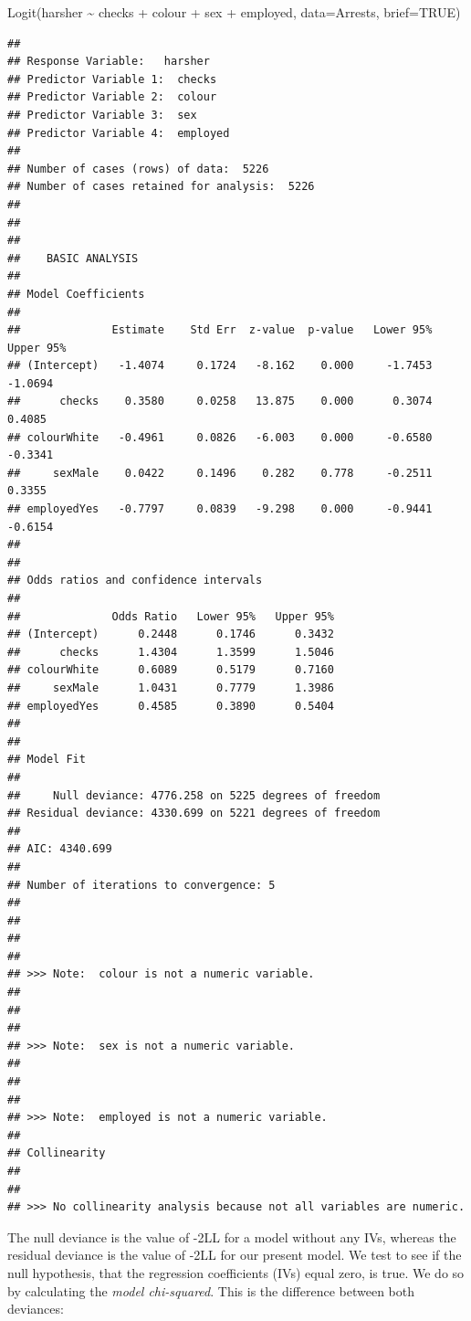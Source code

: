\documentclass[
]{book}
\newenvironment{Shaded}{\begin{snugshade}}{\end{snugshade}}
\newcommand{\AttributeTok}[1]{\textcolor[rgb]{0.77,0.63,0.00}{#1}}
\newcommand{\ConstantTok}[1]{\textcolor[rgb]{0.00,0.00,0.00}{#1}}
\newcommand{\FunctionTok}[1]{\textcolor[rgb]{0.00,0.00,0.00}{#1}}
\newcommand{\NormalTok}[1]{#1}
\newcommand{\SpecialCharTok}[1]{\textcolor[rgb]{0.00,0.00,0.00}{#1}}
\begin{document}
\begin{Shaded}
\begin{Highlighting}[]
\FunctionTok{Logit}\NormalTok{(harsher }\SpecialCharTok{\textasciitilde{}}\NormalTok{ checks }\SpecialCharTok{+}\NormalTok{ colour }\SpecialCharTok{+}\NormalTok{ sex }\SpecialCharTok{+}\NormalTok{ employed, }\AttributeTok{data=}\NormalTok{Arrests, }\AttributeTok{brief=}\ConstantTok{TRUE}\NormalTok{)}
\end{Highlighting}
\end{Shaded}

\begin{verbatim}
## 
## Response Variable:   harsher
## Predictor Variable 1:  checks
## Predictor Variable 2:  colour
## Predictor Variable 3:  sex
## Predictor Variable 4:  employed
## 
## Number of cases (rows) of data:  5226 
## Number of cases retained for analysis:  5226 
## 
## 
## 
##    BASIC ANALYSIS 
## 
## Model Coefficients
## 
##              Estimate    Std Err  z-value  p-value   Lower 95%   Upper 95%
## (Intercept)   -1.4074     0.1724   -8.162    0.000     -1.7453     -1.0694 
##      checks    0.3580     0.0258   13.875    0.000      0.3074      0.4085 
## colourWhite   -0.4961     0.0826   -6.003    0.000     -0.6580     -0.3341 
##     sexMale    0.0422     0.1496    0.282    0.778     -0.2511      0.3355 
## employedYes   -0.7797     0.0839   -9.298    0.000     -0.9441     -0.6154 
## 
## 
## Odds ratios and confidence intervals
## 
##              Odds Ratio   Lower 95%   Upper 95%
## (Intercept)      0.2448      0.1746      0.3432 
##      checks      1.4304      1.3599      1.5046 
## colourWhite      0.6089      0.5179      0.7160 
##     sexMale      1.0431      0.7779      1.3986 
## employedYes      0.4585      0.3890      0.5404 
## 
## 
## Model Fit
## 
##     Null deviance: 4776.258 on 5225 degrees of freedom
## Residual deviance: 4330.699 on 5221 degrees of freedom
## 
## AIC: 4340.699 
## 
## Number of iterations to convergence: 5 
## 
## 
## 
## 
## >>> Note:  colour is not a numeric variable.
## 
## 
## 
## >>> Note:  sex is not a numeric variable.
## 
## 
## 
## >>> Note:  employed is not a numeric variable.
## 
## Collinearity
## 
## 
## >>> No collinearity analysis because not all variables are numeric.
\end{verbatim}

The null deviance is the value of -2LL for a model without any IVs, whereas the residual deviance is the value of -2LL for our present model. We test to see if the null hypothesis, that the regression coefficients (IVs) equal zero, is true. We do so by calculating the \emph{model chi-squared}. This is the difference between both deviances:
\end{document}
